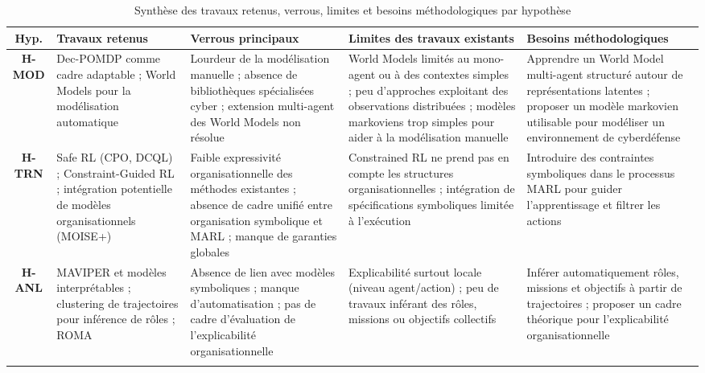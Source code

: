 \begin{table}[H]
  \centering
  \caption{Synthèse des travaux retenus, verrous, limites et besoins méthodologiques par hypothèse}
  \label{tab:synthese_hypotheses}
  \renewcommand{\arraystretch}{1.2}
  {%
    \footnotesize
    \begin{tabularx}{\textwidth}{cXXXX}
      \hline
      \textbf{Hyp.}
       & \textbf{Travaux retenus}
       & \textbf{Verrous principaux}
       & \textbf{Limites des travaux existants}
       & \textbf{Besoins méthodologiques}                                                                                                                                                                      \\
      \hline

      \textbf{H-MOD}
       & Dec-POMDP comme cadre adaptable ; World Models pour la modélisation automatique
       & Lourdeur de la modélisation manuelle ; absence de bibliothèques spécialisées cyber ; extension multi-agent des World Models non résolue
       & World Models limités au mono-agent ou à des contextes simples ; peu d'approches exploitant des observations distribuées ; modèles markoviens trop simples pour aider à la modélisation manuelle
       & Apprendre un World Model multi-agent structuré autour de représentations latentes ; proposer un modèle markovien utilisable pour modéliser un environnement de cyberdéfense                           \\
      \hdashline

      \textbf{H-TRN}
       & Safe RL (CPO, DCQL) ; Constraint-Guided RL ; intégration potentielle de modèles organisationnels (MOISE+)
       & Faible expressivité organisationnelle des méthodes existantes ; absence de cadre unifié entre organisation symbolique et MARL ; manque de garanties globales
       & Constrained RL ne prend pas en compte les structures organisationnelles ; intégration de spécifications symboliques limitée à l'exécution
       & Introduire des contraintes symboliques dans le processus MARL pour guider l'apprentissage et filtrer les actions                                                                                      \\
      \hdashline

      \textbf{H-ANL}
       & MAVIPER et modèles interprétables ; clustering de trajectoires pour inférence de rôles ; ROMA
       & Absence de lien avec modèles symboliques ; manque d'automatisation ; pas de cadre d'évaluation de l'explicabilité organisationnelle
       & Explicabilité surtout locale (niveau agent/action) ; peu de travaux inférant des rôles, missions ou objectifs collectifs
       & Inférer automatiquement rôles, missions et objectifs à partir de trajectoires ; proposer un cadre théorique pour l'explicabilité organisationnelle                                                    \\
      \hdashline


\end{tabularx}}
\end{table}
